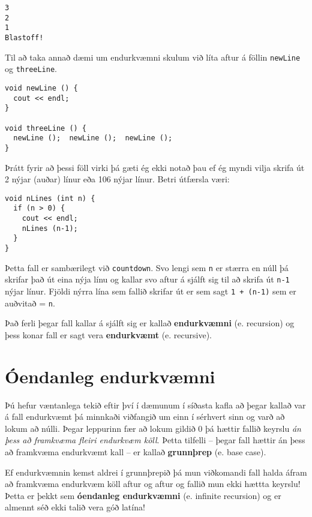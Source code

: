 \begin{verbatim}
3
2
1
Blastoff!
\end{verbatim}
%

Til að taka annað dæmi um endurkvæmni skulum við líta aftur á föllin {\tt newLine} og {\tt threeLine}.

\begin{verbatim}
void newLine () {
  cout << endl;
}

void threeLine () {
  newLine ();  newLine ();  newLine ();
}
\end{verbatim}
%
Þrátt fyrir að þessi föll virki þá gæti ég ekki notað þau ef ég myndi vilja skrifa út 2 nýjar (auðar) línur eða 106 nýjar línur.
Betri útfærsla væri:

\begin{verbatim}
void nLines (int n) {
  if (n > 0) {
    cout << endl;
    nLines (n-1);
  }
}
\end{verbatim}
%
Þetta fall er sambærilegt við {\tt countdown}.
Svo lengi sem {\tt n} er stærra en núll þá skrifar það út eina nýja línu og kallar svo aftur á sjálft sig til að skrifa út {\tt n-1} nýjar línur.
Fjöldi nýrra lína sem fallið skrifar út er sem sagt {\tt 1 + (n-1)} sem er auðvitað = {\tt n}.


Það ferli þegar fall kallar á sjálft sig er kallað {\bf endurkvæmni} (e. recursion) og þess konar fall er sagt vera {\bf endurkvæmt} (e. recursive).

\section {Óendanleg endurkvæmni}

Þú hefur væntanlega tekið eftir því í dæmunum í síðasta kafla að þegar kallað var á fall endurkvæmt þá minnkaði viðfangið um einn í sérhvert sinn og varð að lokum að núlli.
Þegar leppurinn fær að lokum gildið 0 þá hættir fallið keyrslu {\em án þess að framkvæma fleiri endurkvæm köll}.
Þetta tilfelli -- þegar fall hættir án þess að framkvæma endurkvæmt kall -- er kallað {\bf grunnþrep} (e. base case).

Ef endurkvæmnin kemst aldrei í grunnþrepið þá mun viðkomandi fall halda áfram að framkvæma endurkvæm köll aftur og aftur og fallið mun ekki hættta keyrslu!
Þetta er þekkt sem {\bf óendanleg endurkvæmni} (e. infinite recursion) og er almennt séð ekki talið vera góð latína!



